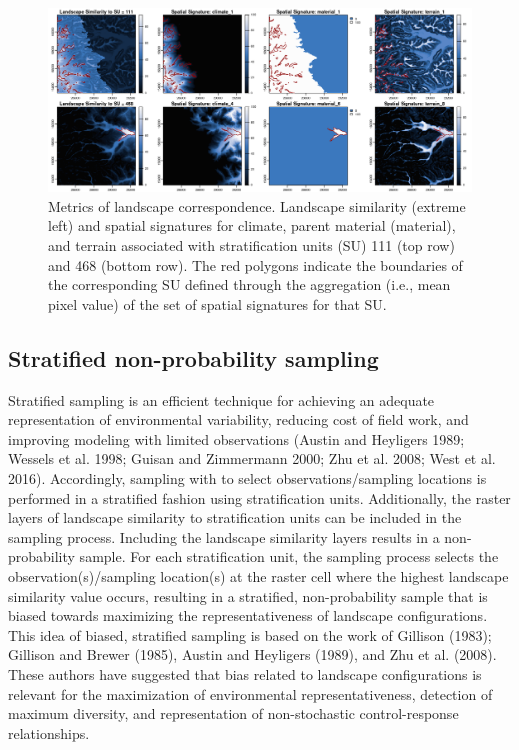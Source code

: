 \begin{figure}[H]

{\centering \includegraphics[width=1\linewidth,height=0.23\textheight]{figures/figure_12} 

}

\caption{Metrics of landscape correspondence. Landscape similarity (extreme left) and spatial signatures for climate, parent material (material), and terrain associated with stratification units (SU) 111 (top row) and 468 (bottom row). The red polygons indicate the boundaries of the corresponding SU defined through the aggregation (i.e., mean pixel value) of the set of spatial signatures for that SU.}\label{fig:f13}
\end{figure}

\hypertarget{stratified-non-probability-sampling}{%
\subsection{Stratified non-probability sampling}\label{stratified-non-probability-sampling}}

Stratified sampling is an efficient technique for achieving an adequate
representation of environmental variability, reducing cost of field work, and
improving modeling with limited observations (Austin and Heyligers 1989; Wessels et al. 1998; Guisan and Zimmermann 2000; Zhu et al. 2008; West et al. 2016). Accordingly, sampling with  to
select observations/sampling locations is performed in a stratified fashion
using stratification units. Additionally, the raster layers of landscape
similarity to stratification units can be included in the sampling process.
Including the landscape similarity layers results in a non-probability sample.
For each stratification unit, the sampling process selects the
observation(s)/sampling location(s) at the raster cell where the highest
landscape similarity value occurs, resulting in a stratified, non-probability
sample that is biased towards maximizing the representativeness of landscape
configurations. This idea of biased, stratified sampling is based on the work of
Gillison (1983); Gillison and Brewer (1985), Austin and Heyligers (1989), and Zhu et al. (2008). These authors have
suggested that bias related to landscape configurations is relevant for the
maximization of environmental representativeness, detection of maximum
diversity, and representation of non-stochastic control-response relationships.

